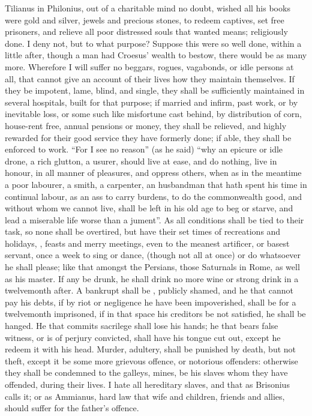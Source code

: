 Tilianus in Philonius, out of a charitable mind no doubt, wished all his books
were gold and silver, jewels and precious stones, to redeem
captives, set free prisoners, and relieve all poor distressed souls that wanted
means; religiously done. I deny not, but to what purpose? Suppose this were so
well done, within a little after, though a man had Croesus' wealth to bestow,
there would be as many more. Wherefore I will suffer no
beggars, rogues, vagabonds, or idle persons at all, that
cannot give an account of their lives how they maintain
themselves. If they be impotent, lame, blind, and single, they shall be
sufficiently maintained in several hospitals, built for that purpose; if
married and infirm, past work, or by inevitable loss, or some such like
misfortune cast behind, by distribution of corn, house-rent
free, annual pensions or money, they shall be relieved, and highly rewarded for
their good service they have formerly done; if able, they shall be enforced to
work. \enquote{For I see no reason} (as he
said) \enquote{why an epicure or idle drone, a rich glutton, a usurer, should live at
ease, and do nothing, live in honour, in all manner of pleasures, and oppress
others, when as in the meantime a poor labourer, a smith, a carpenter, an
husbandman that hath spent his time in continual labour, as an ass to carry
burdens, to do the commonwealth good, and without whom we cannot live, shall be
left in his old age to beg or starve, and lead a miserable life worse than a
jument}. As all conditions shall be tied to their task, so
none shall be overtired, but have their set times of recreations and holidays,
, feasts and merry meetings, even to the meanest artificer,
or basest servant, once a week to sing or dance, (though not all at once) or do
whatsoever he shall please; like that 
amongst the Persians, those Saturnals in Rome, as well as his master.
If any be drunk, he shall drink no more wine or strong
drink in a twelvemonth after. A bankrupt shall be
, publicly shamed, and he
that cannot pay his debts, if by riot or negligence he have been impoverished,
shall be for a twelvemonth imprisoned, if in that space his creditors be not
satisfied, he shall be hanged. He that
commits sacrilege shall lose his hands; he that bears false witness, or is of
perjury convicted, shall have his tongue cut out, except he redeem it with his
head. Murder, adultery, shall be punished by death,
but not theft, except it be some more grievous offence, or
notorious offenders: otherwise they shall be condemned to the galleys, mines,
be his slaves whom they have offended, during their lives. I hate all
hereditary slaves, and that  as
Brisonius calls it; or as Ammianus,
 hard law that wife and children, friends and allies, should
suffer for the father's offence.

